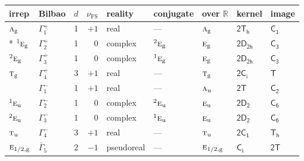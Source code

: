 \documentclass[10pt,a4paper]{article}
\makeatletter
\def\grouprule#1#2{\noalign{\marks\LTgroupmarks{\the\belowrulesep}\nobreak\vskip#1%
  \vskip\aboverulesep}\multispan\LT@cols\unskip{\leaders\hrule\@height#2\hfill\kern\z@}\cr
  \noalign{\penalty\LTrulebreak\vskip\belowrulesep\global\@lastruleclass\z@}}
\numberwithin{equation}{section}
\newcommand{\grp}[1]{\mathsf{#1}}
\newcommand{\irr}[1]{\text{\normalfont\scshape #1}}
\newcommand{\conjpair}[1]{{}^{#1}}
\newcommand{\detbox}[1]{{\setlength{\fboxsep}{1pt}\fbox{#1}}}
\newcommand{\ptag}[1]{\mathrm{#1}}
\newcommand{\fsind}{\nu_{\mathrm{FS}}}
\makeatother
\begin{document}
\setlength{\emergencystretch}{2em}\par\setlength{\emergencystretch}{0pt}
{\small\renewcommand{\arraystretch}{1.25}\setlength{\tabcolsep}{4pt}\begin{longtable}{@{}llrrlllll@{}}\toprule
irrep & Bilbao & $d$ & $\fsind$ & reality & conjugate & over $\mathbb{R}$ & kernel & image\\\midrule\endhead
\bottomrule\endfoot\endlastfoot
$\irr{a}_{\ptag{g}}$ & $\Gamma_{1}^{+}$ & 1 & $+1$ & real & --- & $\irr{a}_{\ptag{g}}$ & \href{2Th.pdf}{$\grp{2T_{h}}$} & \href{../../../rotation/data/pdf/C1.pdf}{$\grp{C_{1}}$}\\*
$\conjpair{1}\irr{e}_{\ptag{g}}$ & $\Gamma_{2}^{+}$ & 1 & $0$ & complex & $\conjpair{2}\irr{e}_{\ptag{g}}$ & $\irr{e}_{\ptag{g}}$ & \href{2D2h.pdf}{$\grp{2D_{2h}}$} & \href{../../../rotation/data/pdf/C3.pdf}{$\grp{C_{3}}$}\\
$\conjpair{2}\irr{e}_{\ptag{g}}$ & $\Gamma_{3}^{+}$ & 1 & $0$ & complex & $\conjpair{1}\irr{e}_{\ptag{g}}$ & $\irr{e}_{\ptag{g}}$ & \href{2D2h.pdf}{$\grp{2D_{2h}}$} & \href{../../../rotation/data/pdf/C3.pdf}{$\grp{C_{3}}$}\\
$\irr{t}_{\ptag{g}}$ & $\Gamma_{4}^{+}$ & 3 & $+1$ & real & --- & $\irr{t}_{\ptag{g}}$ & \href{2S2.pdf}{$\grp{2C_{i}}$} & \href{../../../rotation/data/pdf/T.pdf}{$\grp{T}$}\\
\detbox{$\irr{a}_{\ptag{u}}$} & $\Gamma_{1}^{-}$ & 1 & $+1$ & real & --- & $\irr{a}_{\ptag{u}}$ & \href{2T.pdf}{$\grp{2T}$} & \href{../../../rotation/data/pdf/C2.pdf}{$\grp{C_{2}}$}\\
$\conjpair{1}\irr{e}_{\ptag{u}}$ & $\Gamma_{2}^{-}$ & 1 & $0$ & complex & $\conjpair{2}\irr{e}_{\ptag{u}}$ & $\irr{e}_{\ptag{u}}$ & \href{2D2.pdf}{$\grp{2D_{2}}$} & \href{../../../rotation/data/pdf/C6.pdf}{$\grp{C_{6}}$}\\
$\conjpair{2}\irr{e}_{\ptag{u}}$ & $\Gamma_{3}^{-}$ & 1 & $0$ & complex & $\conjpair{1}\irr{e}_{\ptag{u}}$ & $\irr{e}_{\ptag{u}}$ & \href{2D2.pdf}{$\grp{2D_{2}}$} & \href{../../../rotation/data/pdf/C6.pdf}{$\grp{C_{6}}$}\\
$\irr{t}_{\ptag{u}}$ & $\Gamma_{4}^{-}$ & 3 & $+1$ & real & --- & $\irr{t}_{\ptag{u}}$ & \href{2C1.pdf}{$\grp{2C_{1}}$} & \href{../../../rotation/data/pdf/Th.pdf}{$\grp{T_{h}}$}\\
\grouprule{0pt}{\lightrulewidth}
$\irr{e}_{1/2,\ptag{g}}$ & $\bar{\Gamma}_{5}$ & 2 & $-1$ & pseudoreal & --- & $\irr{e}_{1/2,\ptag{g}}$ & \href{S2.pdf}{$\grp{C_{i}}$} & \href{2T.pdf}{$\grp{2T}$}\\

\end{longtable}}
\end{document}
